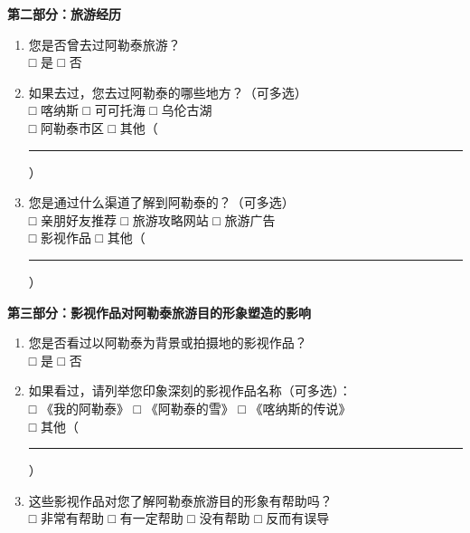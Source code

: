 \documentclass[10pt]{article}
\newcommand{\fillline}{\rule{2.5cm}{0.4pt}}
\begin{document}
\begin{CJK*}{UTF8}{gbsn}
\vspace{0.5cm}
\textbf{第二部分：旅游经历}

\begin{enumerate}[label=\arabic*., resume, itemsep=0.8cm]
\item 您是否曾去过阿勒泰旅游？\\
\hspace{1cm}□ 是 \hspace{3cm} □ 否

\item 如果去过，您去过阿勒泰的哪些地方？（可多选）\\
\hspace{1cm}□ 喀纳斯 \hspace{2cm} □ 可可托海 \hspace{2cm} □ 乌伦古湖\\
\hspace{1cm}□ 阿勒泰市区 \hspace{2cm} □ 其他（\fillline）

\item 您是通过什么渠道了解到阿勒泰的？（可多选）\\
\hspace{1cm}□ 亲朋好友推荐 \hspace{2cm} □ 旅游攻略网站 \hspace{2cm} □ 旅游广告\\
\hspace{1cm}□ 影视作品 \hspace{2cm} □ 其他（\fillline）
\end{enumerate}

\vspace{0.5cm}
\textbf{第三部分：影视作品对阿勒泰旅游目的形象塑造的影响}

\begin{enumerate}[label=\arabic*., resume, itemsep=0.8cm]
\item 您是否看过以阿勒泰为背景或拍摄地的影视作品？\\
□ 是 \hspace{2cm} □ 否

\item 如果看过，请列举您印象深刻的影视作品名称（可多选）：\\
□ 《我的阿勒泰》 \hspace{2cm} □ 《阿勒泰的雪》 \hspace{2cm} □ 《喀纳斯的传说》\\
□ 其他（\fillline）

\item 这些影视作品对您了解阿勒泰旅游目的形象有帮助吗？\\
□ 非常有帮助 \hspace{1cm} □ 有一定帮助 \hspace{1cm} □ 没有帮助 \hspace{1cm} □ 反而有误导


\end{enumerate}
\end{CJK*}
\end{document}
